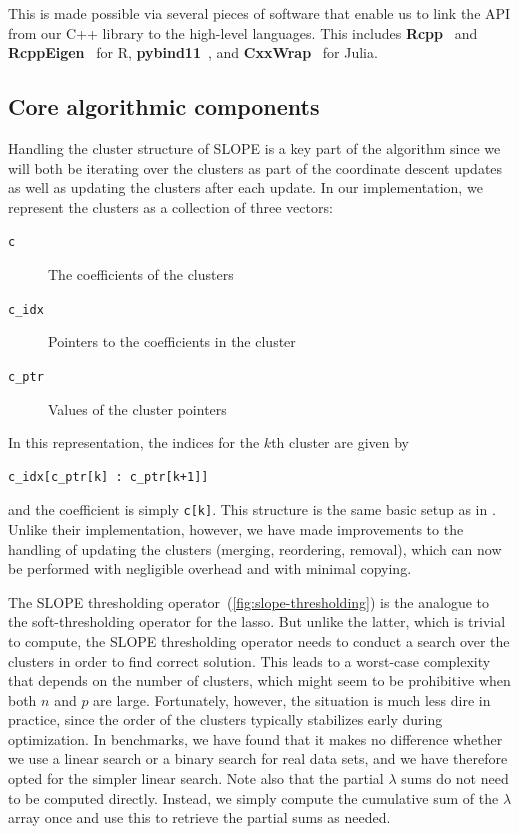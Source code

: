 \documentclass[a4paper,fleqn]{cas-sc}
\begin{document}
This is made possible via several pieces of software that enable us to link the
API from our \textsf{C++} library to the high-level languages. This includes
\textbf{Rcpp}~\citep{eddelbuettel2011} and \textbf{RcppEigen}~\citep{bates2013}
for \textsf{R}, \textbf{pybind11}~\citep{jakob2025}, and
\textbf{CxxWrap}~\citep{janssens2020} for \textsf{Julia}.

\subsection{Core algorithmic components}

Handling the cluster structure of SLOPE is a key part of the algorithm since we
will both be iterating over the clusters as part of the coordinate descent
updates as well as updating the clusters after each update. In our
implementation, we represent the clusters as a collection of three vectors:

\begin{description}
  \item[\texttt{c}] The coefficients of the clusters
  \item[\texttt{c\_idx}] Pointers to the coefficients in the cluster
  \item[\texttt{c\_ptr}] Values of the cluster pointers
\end{description}

In this representation, the indices for the \(k\)th cluster are given by
\begin{Verbatim}
c_idx[c_ptr[k] : c_ptr[k+1]]
\end{Verbatim}
and the coefficient is simply \texttt{c[k]}. This structure is the same basic
setup as in \citet{larsson2023}. Unlike their implementation, however, we have
made improvements to the handling of updating the clusters (merging, reordering,
removal), which can now be performed with negligible overhead and with minimal
copying.

The SLOPE thresholding operator~(\autoref{fig:slope-thresholding}) is the
analogue to the soft-thresholding operator for the lasso. But unlike the latter,
which is trivial to compute, the SLOPE thresholding operator needs to conduct a
search over the clusters in order to find correct solution. This leads to a
worst-case complexity that depends on the number of clusters, which might seem
to be prohibitive when both \(n\) and \(p\) are large. Fortunately, however, the
situation is much less dire in practice, since the order of the clusters
typically stabilizes early during optimization. In benchmarks, we have found
that it makes no difference whether we use a linear search or a binary search
for real data sets, and we have therefore opted for the simpler linear search.
Note also that the partial \(\lambda\) sums do not need to be computed directly.
Instead, we simply compute the cumulative sum of the \(\lambda\) array once and
use this to retrieve the partial sums as needed.
\end{document}
